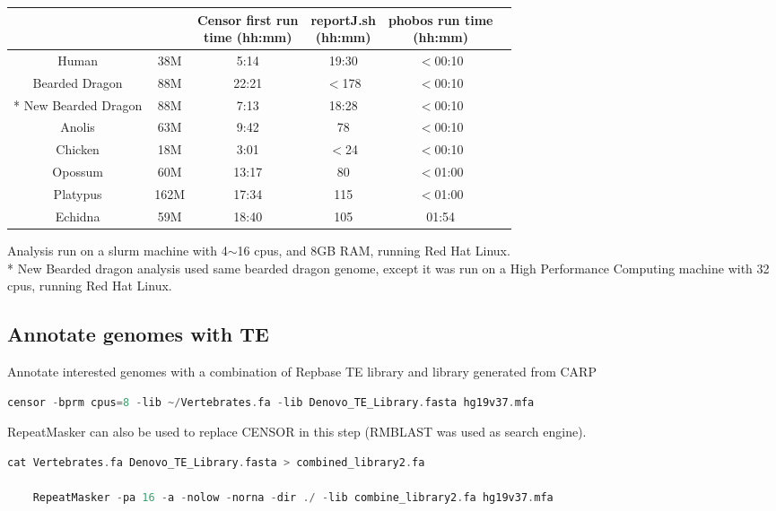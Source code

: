 \documentclass[a4paper,12pt]{article}
\begin{document}
	\footnotesize  %
	\setlength\tabcolsep{1.5pt}
	\begin{center}
		\begin{tabular}{ | c | c | c | c| c |c|}
			\hline
			\thead{Genome}	& 	\thead{Consensus sequences size}	&	\thead{Censor first run \\ time (hh:mm)}	&	\thead{reportJ.sh \\ (hh:mm)}	&	\thead{phobos run time \\ (hh:mm)} \\
			\hline
			Human	&	38M	&	5:14	&	19:30	&	$<$00:10 \\
			\hline 
			Bearded Dragon	&	88M	&	22:21	&	$<$178	&	$<$00:10 \\
			\hline
			* New Bearded Dragon	&	88M	&	7:13	&	18:28	&	$<$00:10 \\
			\hline
			Anolis	&	63M	&	9:42	&	78	&	$<$00:10 \\
			\hline
			Chicken	&	18M	&	3:01	&	$<$24	&	$<$00:10 \\
			\hline
			Opossum	&	60M	&	13:17	&	80	&	$<$01:00 \\
			\hline
			Platypus	&	162M	&	17:34	&	115	&	$<$01:00 \\
			\hline
			Echidna	&	59M	&	18:40	&	105	&	01:54 \\
			\hline
		\end{tabular}
	\end{center}
	
	\noindent Analysis run on a slurm machine with 4$\sim$16 cpus, and 8GB RAM, running Red Hat Linux.\\
	{*} New Bearded dragon analysis used same bearded dragon genome, except it was run on a High Performance Computing machine with 32 cpus, running Red Hat Linux. \\
	
	\subsection{Annotate genomes with TE}
	Annotate interested genomes with a combination of Repbase TE library and library generated from CARP
		\begin{lstlisting}[language=scala]
		censor -bprm cpus=8 -lib ~/Vertebrates.fa -lib Denovo_TE_Library.fasta hg19v37.mfa \end{lstlisting}
	RepeatMasker can also be used to replace CENSOR in this step (RMBLAST was used as search engine).	
	\begin{lstlisting}[language=scala]
	cat Vertebrates.fa Denovo_TE_Library.fasta > combined_library2.fa
	
	RepeatMasker -pa 16 -a -nolow -norna -dir ./ -lib combine_library2.fa hg19v37.mfa \end{lstlisting}
\end{document}
